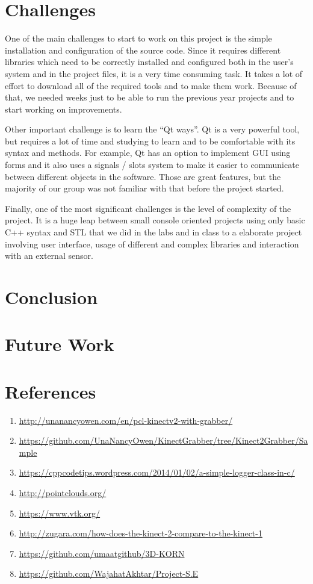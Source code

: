 \documentclass[aps,letterpaper,11pt]{revtex4}
\begin{document}
\section{Challenges}
One of the main challenges to start to work on this project is the simple installation and configuration of the source code. Since it requires different libraries which need to be correctly installed and configured both in the user's system and in the project files, it is a very time consuming task. It takes a lot of effort to download all of the required tools and to make them work. Because of that, we needed weeks just to be able to run the previous year projects and to start working on improvements.\par
Other important challenge is to learn the “Qt ways”. Qt is a very powerful tool, but requires a lot of time and studying to learn and to be comfortable with its syntax and methods. For example, Qt has an option to implement GUI using forms and it also uses a signals / slots system to make it easier to communicate between different objects in the software. Those are great features, but the majority of our group was not familiar with that before the project started.\par
Finally, one of the most significant challenges is the level of complexity of the project. It is a huge leap between small console oriented projects using only basic C++ syntax and STL that we did in the labs and in class to a elaborate project involving user interface, usage of different and complex libraries and interaction with an external sensor.\par
\pagebreak

\section{Conclusion}
\pagebreak

\section{Future Work}
\pagebreak

\section{References}
\begin{enumerate}
\item \url{http://unanancyowen.com/en/pcl-kinectv2-with-grabber/}
\item \url{https://github.com/UnaNancyOwen/KinectGrabber/tree/Kinect2Grabber/Sample}
\item \url{https://cppcodetips.wordpress.com/2014/01/02/a-simple-logger-class-in-c/}
\item \url{http://pointclouds.org/}
\item \url{https://www.vtk.org/}
\item \url{http://zugara.com/how-does-the-kinect-2-compare-to-the-kinect-1}
\item \url{https://github.com/umaatgithub/3D-KORN}
\item \url{https://github.com/WajahatAkhtar/Project-S.E}
\end{enumerate}
\end{document}
